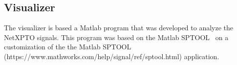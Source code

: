 \graphicspath{{./lib/binary_source/figures/}}
\clearpage
\acresetall
\begin{refsection}

\chapter{Visualizer}

The visualizer is based a Matlab program that was developed to analyze the NetXPTO signals.
This program was based on the Matlab SPTOOL~\cite{sptool} 
on a customization of the the Matlab SPTOOL (https://www.mathworks.com/help/signal/ref/sptool.html) application.


\clearpage
\printbibliography[heading=subbibliography]
\end{refsection}
\cleardoublepage